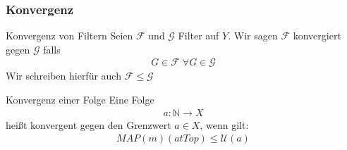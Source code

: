 \documentclass{beamer}
\begin{document}
\begin{frame}
    \frametitle{Konvergenz}
    \begin{block}{Konvergenz von Filtern}
    Seien  $\mathcal{F}$ und $\mathcal{G}$ Filter auf $Y$. Wir sagen $\mathcal{F}$ konvergiert gegen  $\mathcal{G}$ falls
    \begin{align}
       G \in \mathcal{F} \; \forall G \in \mathcal{G}
    \end{align}
    Wir schreiben hierfür auch $\mathcal{F} \leq \mathcal{G}$
    \end{block}
 
    \begin{block}{Konvergenz einer Folge}
        Eine Folge
    \begin{align*}
            a: \mathbb{N} \rightarrow X
            \end{align*}
    heißt konvergent gegen  den Grenzwert $a \in X$, wenn gilt:
    \begin{align}  
        MAP(m)(atTop) \leq  \mathcal{U}(a)
    \end{align}
\end{block}

\end{frame}
\end{document}
